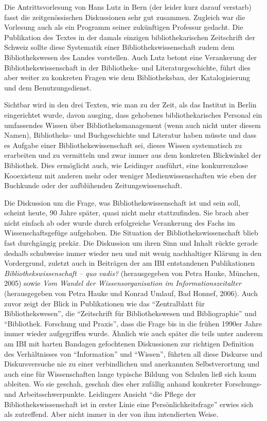 \documentclass[a4paper,
fontsize=11pt,
oneside,
numbers=noperiodatend,
parskip=half-,
bibliography=totoc,
final
]{scrartcl}
\begin{document}
Die Antrittsvorlesung von Hans Lutz in Bern (der leider kurz darauf
verstarb) fasst die zeitgenössischen Diskussionen sehr gut zusammen.
Zugleich war die Vorlesung auch als ein Programm seiner zukünftigen
Professur gedacht. Die Publikation des Textes in der damals einzigen
bibliothekarischen Zeitschrift der Schweiz sollte diese Systematik einer
Bibliothekswissenschaft zudem dem Bibliothekswesen des Landes
vorstellen. Auch Lutz betont eine Verankerung der
Bibliothekswissenschaft in der Bibliotheks- und Literaturgeschichte,
führt dies aber weiter zu konkreten Fragen wie dem Bibliotheksbau, der
Katalogisierung und dem Benutzungsdienst.

Sichtbar wird in den drei Texten, wie man zu der Zeit, als das Institut
in Berlin eingerichtet wurde, davon ausging, dass gehobenes
bibliothekarisches Personal ein umfassendes Wissen über
Bibliotheksmanagement (wenn auch nicht unter diesem Namen), Bibliotheks-
und Buchgeschichte und Literatur haben müsste und dass es Aufgabe einer
Bibliothekswissenschaft sei, dieses Wissen systematisch zu erarbeiten
und zu vermitteln und zwar immer aus dem konkreten Blickwinkel der
Bibliothek. Dies ermöglicht auch, wie Leidinger ausführt, eine
konkurrenzlose Kooexistenz mit anderen mehr oder weniger
Medienwissenschaften wie eben der Buchkunde oder der aufblühenden
Zeitungswissenschaft.

Die Diskussion um die Frage, was Bibliothekswissenschaft ist und sein
soll, scheint heute, 90 Jahre später, quasi nicht mehr stattzufinden.
Sie brach aber nicht einfach ab oder wurde durch erfolgreiche
Verankerung des Fachs im Wissenschaftsgefüge aufgehoben. Die Situation
der Bibliothekswissenschaft blieb fast durchgängig prekär. Die
Diskussion um ihren Sinn und Inhalt rückte gerade deshalb schubweise
immer wieder neu und mit wenig nachhaltiger Klärung in den Vordergrund,
zuletzt auch in Beiträgen der am IBI entstandenen Publikationen
\emph{Bibliothekswissenschaft -- quo vadis?} (herausgegeben von Petra
Hauke, München, 2005) sowie \emph{Vom Wandel der Wissensorganisation im
Informationszeitalter} (herausgegeben von Petra Hauke und Konrad Umlauf,
Bad Honnef, 2006). Auch zuvor zeigt der Blick in Publikationen wie das
\enquote{Zentralblatt für Bibliothekswesen}, die \enquote{Zeitschrift
für Bibliothekswesen und Bibliographie} und \enquote{Bibliothek.
Forschung und Praxis}, dass die Frage bis in die frühen 1990er Jahre
immer wieder aufgegriffen wurde. Ähnlich wie auch später die teils unter
anderem am IBI mit harten Bandagen gefochtenen Diskussionen zur
richtigen Definition des Verhältnisses von \enquote{Information} und
\enquote{Wissen}, führten all diese Diskurse und Diskursversuche nie zu
einer verbindlichen und anerkannten Selbstverortung und auch eine für
Wissenschaften lange typische Bildung von Schulen ließ sich kaum
ableiten. Wo sie geschah, geschah dies eher zufällig anhand konkreter
Forschungs- und Arbeitsschwerpunkte. Leidingers Ansicht \enquote{die
Pflege der Bibliothekswissenschaft ist in erster Linie eine
Persönlichkeitsfrage} erwies sich als zutreffend. Aber nicht immer in
der von ihm intendierten Weise.
\end{document}
